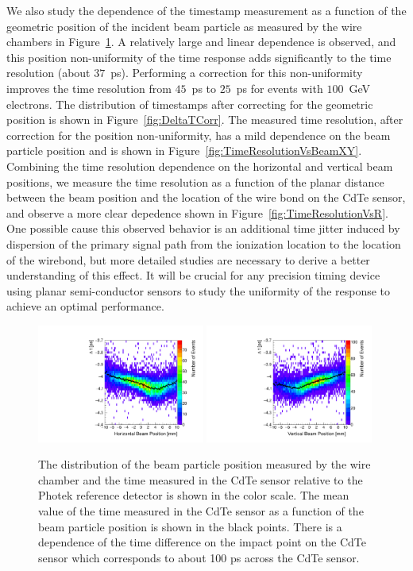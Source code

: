 We also study the dependence of the timestamp measurement as a function of the geometric
position of the incident beam particle as measured by the wire chambers in 
Figure~\ref{fig:DeltaTVsBeamXY}. A relatively large and linear dependence is observed, 
and this position non-uniformity of the time response adds significantly to the 
time resolution (about $37$~ps). Performing a correction for this non-uniformity improves
the time resolution from $45$~ps to $25$~ps for events with $100$~GeV electrons.
The distribution of timestamps after correcting for the geometric position is shown
in Figure~\ref{fig:DeltaTCorr}. The measured time resolution, after correction for
the position non-uniformity, has a mild dependence on the beam particle position 
and is shown in Figure~\ref{fig:TimeResolutionVsBeamXY}. Combining the time resolution
dependence on the horizontal and vertical beam positions, we measure the time resolution
as a function of the planar distance between the beam position and the location of the 
wire bond on the CdTe sensor, and observe a more clear depedence shown in 
Figure~\ref{fig:TimeResolutionVsR}. One possible cause this observed behavior
is an additional time jitter induced by dispersion of the primary signal path from the
ionization location to the location of the wirebond, but more detailed studies are necessary
to derive a better understanding of this effect. It will be crucial for any precision timing device
using planar semi-conductor sensors to study the uniformity of the response to achieve an optimal performance.
%
\begin{figure}[htbp] 
\centering
\includegraphics[width=0.49\textwidth]{figures/DeltaTVsHorizontalPosition.pdf} 
\includegraphics[width=0.49\textwidth]{figures/DeltaTVsVerticalPosition.pdf} 
\caption{ The distribution of the beam particle position measured by the wire chamber
and the time measured in the CdTe sensor relative to the Photek reference detector
is shown in the color scale. The mean value of the time measured in the CdTe sensor as a function
of the beam particle position is shown in the black points. There is a dependence of the time difference
on the impact point on the CdTe sensor which corresponds to about 100 ps across the CdTe sensor.} 
\label{fig:DeltaTVsBeamXY} 
\end{figure} 

